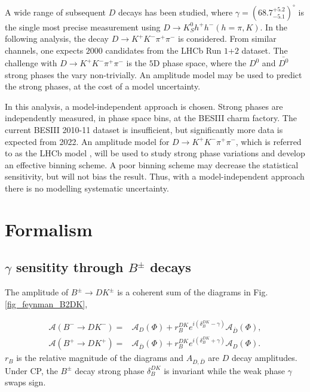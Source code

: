 \documentclass[12pt, a4paper, notitlepage, onecolumn]{article}
\begin{document}
A wide range of subsequent $D$ decays has been studied, where $\gamma = (68.7^{+5.2}_{-5.1})^\circ$ is the single most precise measurement using $D\to K_S^0h^+h^-(h = \pi, K)$\cite{cite_LHCbGGSZKSpipi}. In the following analysis, the decay $D\to K^+K^-\pi^+\pi^-$ is considered. From similar channels, one expects $2000$ candidates from the LHCb Run $1$+$2$ dataset. The challenge with $D\to K^+K^-\pi^+\pi^-$ is the $5$D phase space, where the $D^0$ and $\bar{D^0}$ strong phases the vary non-trivially. An amplitude model may be used to predict the strong phases, at the cost of a model uncertainty.

In this analysis, a model-independent approach is chosen. Strong phases are independently measured, in phase space bins, at the BESIII charm factory. The current BESIII 2010-11 dataset is insufficient, but significantly more data is expected from 2022. An amplitude model for $D\to K^+K^-\pi^+\pi^-$, which is referred to as the LHCb model \cite{cite_AmplitudeModel}, will be used to study strong phase variations and develop an effective binning scheme. A poor binning scheme may decrease the statistical sensitivity, but will not bias the result. Thus, with a model-independent approach there is no modelling systematic uncertainty.

\section{Formalism}
\subsection{\texorpdfstring{$\gamma$}{gamma} sensitity through \texorpdfstring{$B^\pm$}{B} decays}
The amplitude of $B^\pm\to DK^\pm$ is a coherent sum of the diagrams in Fig. \ref{fig_feynman_B2DK},

\begin{align}
  \mathcal{A}(B^-\to DK^-) =& \mathcal{A}_D(\Phi) + r_B^{DK}e^{i(\delta_B^{DK} - \gamma)}\mathcal{A}_{\bar{D}}(\Phi), \label{eq_Bm2DKm} \\
  \mathcal{A}(B^+\to DK^+) =& \mathcal{A}_{\bar{D}}(\Phi) + r_B^{DK}e^{i(\delta_B^{DK} + \gamma)}\mathcal{A}_D(\Phi). \label{eq_Bp2DKp}
\end{align}
$r_B$ is the relative magnitude of the diagrams and $A_{D, \bar{D}}$ are $D$ decay amplitudes. Under CP, the $B^\pm$ decay strong phase $\delta_B^{DK}$ is invariant while the weak phase $\gamma$ swaps sign.
\end{document}
